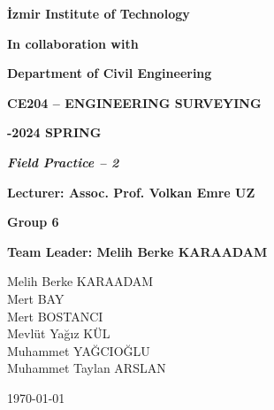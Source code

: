 \documentclass[12pt]{report}
\author{Muhammet Yağcıoğlu - 290204042}
\begin{document}
\onecolumn
\thispagestyle{empty}
\begin{center}


\textbf{\fontsize{14}{\baselineskip}\selectfont İzmir Institute of Technology}


\textbf{\fontsize{14}{\baselineskip}\selectfont In collaboration with}


\textbf{\fontsize{14}{\baselineskip}\selectfont Department of Civil Engineering}

\bigskip



\bigskip

\textbf{\fontsize{15}{\baselineskip}\selectfont CE204 – ENGINEERING
SURVEYING}

\bigskip

\textbf{\fontsize{16}{\baselineskip}-2024 SPRING}

\bigskip

\bigskip



\textit{\textbf{\fontsize{14}{\baselineskip}\selectfont Field Practice – 2}}

\bigskip



\bigskip

\textbf{\fontsize{14}{\baselineskip}\selectfont Lecturer: Assoc. Prof. Volkan Emre UZ }

\bigskip

\textbf{\fontsize{14}{\baselineskip}\selectfont Group 6}

\bigskip

\textbf{\fontsize{14}{\baselineskip}\selectfont Team Leader: Melih Berke	KARAADAM}

\bigskip

Melih Berke	KARAADAM\\
Mert BAY\\
Mert BOSTANCI \\
Mevlüt Yağız KÜL\\
Muhammet YAĞCIOĞLU\\
Muhammet Taylan ARSLAN\\


\bigskip

\bigskip

\bigskip

{\today}
\end{center}

\clearpage




\thispagestyle{fancy}
\pagestyle{fancy}
\end{document}
